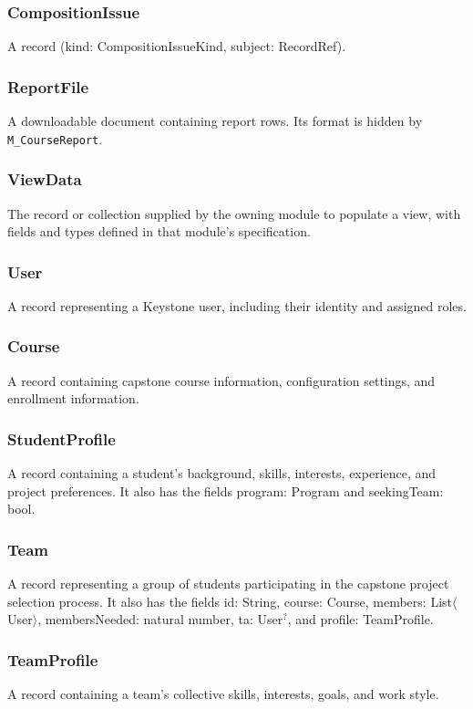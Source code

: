 \documentclass[12pt, titlepage]{article}
\begin{document}
\subsubsection{CompositionIssue}
A record (kind: CompositionIssueKind, subject: RecordRef).

\subsubsection{ReportFile}
A downloadable document containing report rows. Its format is hidden by \texttt{M\_CourseReport}.

\subsubsection{ViewData}
The record or collection supplied by the owning module to populate a view, with fields and types defined in that module's specification.

\subsubsection{User}
A record representing a Keystone user, including their identity and assigned roles.

\subsubsection{Course}
A record containing capstone course information, configuration settings, and enrollment information.

\subsubsection{StudentProfile}
A record containing a student's background, skills, interests, experience, and project preferences.
It also has the fields program: Program and seekingTeam: bool.

\subsubsection{Team}
A record representing a group of students participating in the capstone project selection process.
It also has the fields id: String, course: Course, members: List$\langle$User$\rangle$, membersNeeded: natural number,
ta: User$^{?}$, and profile: TeamProfile.

\subsubsection{TeamProfile}
A record containing a team's collective skills, interests, goals, and work style.
\end{document}
